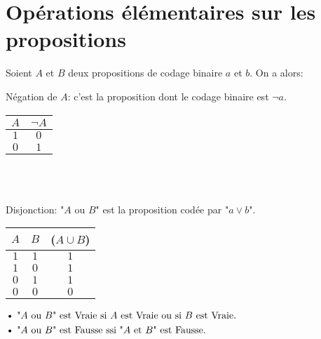 \documentclass[12pt,twoside,a4paper]{article}
\begin{document}
	\section{Op\'erations \'el\'ementaires sur les propositions}
		Soient $A$ et $B$ deux propositions de codage binaire $a$ et $b$. On a  alors:
		\begin{liste}
			\item N\'egation de $A$: c'est la proposition dont le codage binaire est $\neg a$.\\
				\begin{tabular}{ c | c }
					$A$ & $\neg A$\\\hline 
					$1$&$0$\\
					$0$&$1$\\
				\end{tabular}\\\\
			\item Disjonction: "$A$ ou $B$" est la proposition cod\'ee par "$a\vee b$".\\
				\begin{tabular}{ c | c | c  }
					$A$ & $B$ &($A\cup B$)\\\hline 
					$1$&$1$&$1$\\
					$1$&$0$&$1$\\
					$0$&$1$&$1$\\
					$0$&$0$&$0$\\
				\end{tabular} 
				$\begin{aligned}
					&\text{\textbullet}\ \text{"}A\text{ ou }B\text{" est Vraie si }A\text{ est Vraie ou si }B\text{ est Vraie.}\\
					&\text{\textbullet}\ \text{"}A\text{ ou }B\text{" est Fausse ssi "}A\text{ et }B\text{" est Fausse.}
				\end{aligned}$
		\end{liste}
\end{document}
